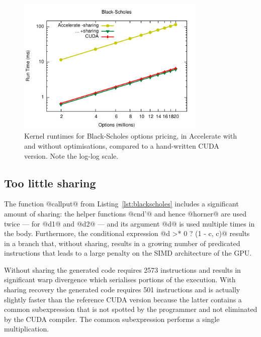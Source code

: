 \begin{figure}
    \begin{center}
        \includegraphics[width=0.8\textwidth]{images/sec-6/black-scholes/black-scholes}
    \end{center}
    \caption[Black-Scholes kernel benchmarks]{Kernel runtimes for Black-Scholes
        options pricing, in Accelerate with and without optimisations, compared
        to a hand-written CUDA version. Note the log-log scale.}
    \label{fig:blackscholes}
\end{figure}

\subsection{Too little sharing}

The function @callput@ from Listing~\ref{lst:blackscholes} includes a
significant amount of sharing: the helper functions @cnd'@ and hence
@horner@ are used twice --- for @d1@ and @d2@ --- and its
argument @d@ is used multiple times in the body. Furthermore, the
conditional expression @d >* 0 ? (1 - c, c)@ results in a branch that,
without sharing, results in a growing number of predicated instructions that
leads to a large penalty on the SIMD architecture of the GPU.

Without sharing the generated code requires 2573 instructions and results in
significant warp divergence which serialises portions of the execution. With
sharing recovery the generated code requires 501 instructions and is actually
slightly faster than the reference CUDA version because the latter contains a
common subexpression that is not spotted by the programmer and not eliminated by
the CUDA compiler. The common subexpression performs a single multiplication.


